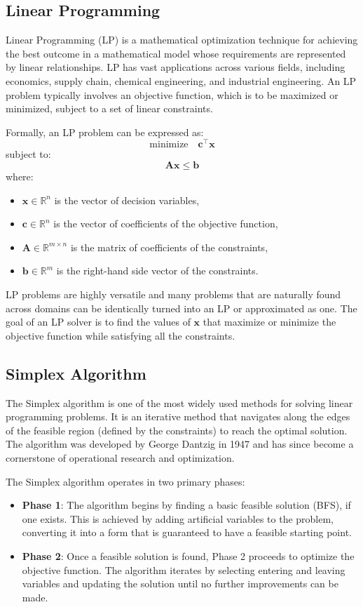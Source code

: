 \documentclass[conference]{IEEEtran}
\begin{document}
\subsection{Linear Programming}

Linear Programming (LP) is a mathematical optimization technique for achieving the best outcome in a mathematical model whose requirements are represented by linear relationships. 
LP has vast applications across various fields, including economics, supply chain, chemical engineering, and industrial engineering. 
An LP problem typically involves an objective function, which is to be maximized or minimized, subject to a set of linear constraints.

Formally, an LP problem can be expressed as:
\[
\text{minimize} \quad \mathbf{c}^\top \mathbf{x}
\]
subject to:
\[
\mathbf{A} \mathbf{x} \leq \mathbf{b}
\]
where:
\begin{itemize}
    \item \(\mathbf{x} \in \mathbb{R}^n\) is the vector of decision variables,
    \item \(\mathbf{c} \in \mathbb{R}^n\) is the vector of coefficients of the objective function,
    \item \(\mathbf{A} \in \mathbb{R}^{m \times n}\) is the matrix of coefficients of the constraints,
    \item \(\mathbf{b} \in \mathbb{R}^m\) is the right-hand side vector of the constraints.
\end{itemize}


LP problems are highly versatile and many problems that are naturally found across domains can be identically turned into an LP or approximated as one.
The goal of an LP solver is to find the values of \(\mathbf{x}\) that maximize or minimize the objective function while satisfying all the constraints.

\subsection{Simplex Algorithm}

The Simplex algorithm is one of the most widely used methods for solving linear programming problems. It is an iterative method that navigates along the edges of the feasible region (defined by the constraints) to reach the optimal solution. The algorithm was developed by George Dantzig in 1947 and has since become a cornerstone of operational research and optimization.

The Simplex algorithm operates in two primary phases:
\begin{itemize}
    \item \textbf{Phase 1}: The algorithm begins by finding a basic feasible solution (BFS), if one exists. This is achieved by adding artificial variables to the problem, converting it into a form that is guaranteed to have a feasible starting point.
    \item \textbf{Phase 2}: Once a feasible solution is found, Phase 2 proceeds to optimize the objective function. The algorithm iterates by selecting entering and leaving variables and updating the solution until no further improvements can be made.
\end{itemize}
\end{document}
